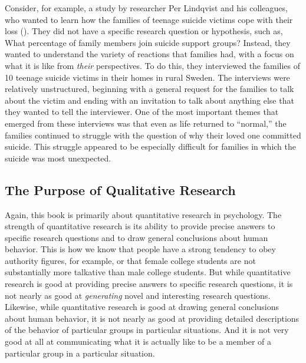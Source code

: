 \documentclass[
]{krantz}
\begin{document}
Consider, for example, a study by researcher Per Lindqvist and his colleagues, who wanted to learn how the families of teenage suicide victims cope with their loss (). They did not have a specific research question or hypothesis, such as, What percentage of family members join suicide support groups? Instead, they wanted to understand the variety of reactions that families had, with a focus on what it is like from \emph{their} perspectives. To do this, they interviewed the families of 10 teenage suicide victims in their homes in rural Sweden. The interviews were relatively unstructured, beginning with a general request for the families to talk about the victim and ending with an invitation to talk about anything else that they wanted to tell the interviewer. One of the most important themes that emerged from these interviews was that even as life returned to ``normal,'' the families continued to struggle with the question of why their loved one committed suicide. This struggle appeared to be especially difficult for families in which the suicide was most unexpected.

\subsection*{The Purpose of Qualitative Research}\label{the-purpose-of-qualitative-research}


Again, this book is primarily about quantitative research in psychology. The strength of quantitative research is its ability to provide precise answers to specific research questions and to draw general conclusions about human behavior. This is how we know that people have a strong tendency to obey authority figures, for example, or that female college students are not substantially more talkative than male college students. But while quantitative research is good at providing precise answers to specific research questions, it is not nearly as good at \emph{generating} novel and interesting research questions. Likewise, while quantitative research is good at drawing general conclusions about human behavior, it is not nearly as good at providing detailed descriptions of the behavior of particular groups in particular situations. And it is not very good at all at communicating what it is actually like to be a member of a particular group in a particular situation.
\end{document}
